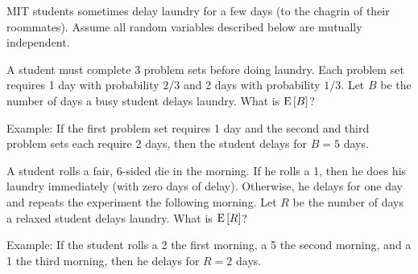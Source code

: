 \documentclass[12pt,twoside]{article}
\begin{document}
\begin{problem}{20}
MIT students sometimes delay laundry for a few days (to the chagrin of their roommates).  Assume all
random variables described below are mutually independent.

\bparts

 A  student must complete 3 problem sets before doing
laundry.  Each problem set requires 1 day with probability $2/3$ and 2
days with probability $1/3$.  Let $B$ be the number of days a busy
student delays laundry.  What is $\mathop{\textup{E}}\nolimits\left[B\right]$?

Example: If the first problem set requires 1 day and the second and
third problem sets each require 2 days, then the student delays for $B
= 5$ days.


 A  student rolls a fair, 6-sided die in the
morning.  If he rolls a 1, then he does his laundry immediately (with
zero days of delay).  Otherwise, he delays for one day and repeats the
experiment the following morning.  Let $R$ be the number of days a
relaxed student delays laundry.  What is $\mathop{\textup{E}}\nolimits\left[R\right]$?

Example: If the student rolls a 2 the first morning, a 5 the second
morning, and a 1 the third morning, then he delays for $R = 2$ days.



\end{problem}
\end{document}
